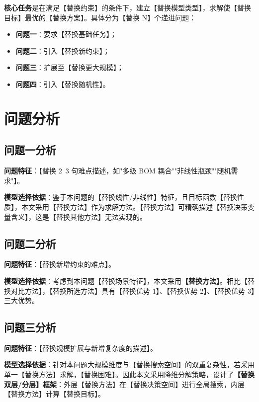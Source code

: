 \documentclass[12pt,a4paper,fontset=fandol]{ctexart}
\begin{document}
\textbf{核心任务}是在满足【替换约束】的条件下，建立【替换模型类型】，求解使【替换目标】最优的【替换方案】。具体分为【替换 N】个递进问题：
\begin{itemize}
    \item \textbf{问题一}：要求【替换基础任务】；
    \item \textbf{问题二}：引入【替换新约束】；
    \item \textbf{问题三}：扩展至【替换更大规模】；
    \item \textbf{问题四}：引入【替换随机性】。
\end{itemize}

\section{问题分析}

\subsection{问题一分析}

\textbf{问题特征}：【替换 2~3 句难点描述，如"多级 BOM 耦合""非线性瓶颈""随机需求"】。

\textbf{模型选择依据}：鉴于本问题的【替换线性/非线性】特征，且目标函数【替换性质】，本文采用【替换方法】作为求解方法。【替换方法】可精确描述【替换决策变量含义】，这是【替换其他方法】无法实现的\cite{1}。

\subsection{问题二分析}

\textbf{问题特征}：【替换新增约束的难点】。

\textbf{模型选择依据}：考虑到本问题【替换场景特征】，本文采用\textbf{【替换方法】}。相比【替换对比方法】，【替换所选方法】具有【替换优势 1】、【替换优势 2】、【替换优势 3】三大优势。

\subsection{问题三分析}

\textbf{问题特征}：【替换规模扩展与新增复杂度的描述】。

\textbf{模型选择依据}：针对本问题大规模维度与【替换搜索空间】的双重复杂性，若采用单一【替换方法】求解，【替换困难】。因此本文采用降维分解策略，设计了\textbf{【替换双层/分层】框架}：外层【替换方法】在【替换决策空间】进行全局搜索\cite{2}，内层【替换方法】计算【替换目标】。
\end{document}
